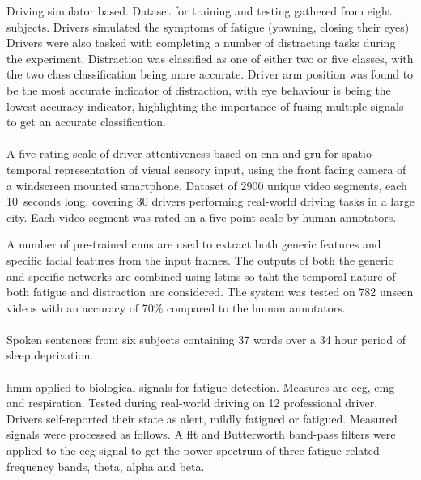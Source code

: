 \documentclass[11pt, parskip=half*,twoside=false]{scrbook}
\begin{document}
Driving simulator based. Dataset for training and testing gathered from eight subjects. Drivers simulated the symptoms of fatigue (yawning, closing their eyes) Drivers were also tasked with completing a number of distracting tasks during the experiment. Distraction was classified as one of either two or five classes, with the two class classification being more accurate. Driver arm position was found to be the most accurate indicator of distraction, with eye behaviour is being the lowest accuracy indicator, highlighting the importance of fusing multiple signals to get an accurate classification. 

\paragraph{\citet{duaAutoRateHowAttentive2019}}  A five rating scale of driver attentiveness based on \gls{cnn} and \gls{gru} for spatio-temporal representation of visual sensory input, using the front facing camera of a windscreen mounted smartphone. Dataset of 2900 unique video segments, each 10~seconds long, covering 30 drivers performing real-world driving tasks in a large city. Each video segment was rated on a five point scale by human annotators. 

A number of pre-trained \glspl{cnn} are used to extract both generic features and specific facial features from the input frames. The outputs of both the generic and specific networks are combined using \glspl{lstm} so taht the temporal nature of both fatigue and distraction are considered. The system was tested on 782 unseen videos with an accuracy of 70\% compared to the human annotators.
	
\paragraph{\citet{greeleyDetectingFatigueVoice2006}} Spoken sentences from six subjects containing 37 words over a 34 hour period of sleep deprivation. 

\paragraph{\citet{fuDynamicDriverFatigue2016}} \gls{hmm} applied to biological signals for fatigue detection. Measures are \gls{eeg}, \gls{emg} and respiration. Tested during real-world driving on 12 professional driver. Drivers self-reported their state as alert, mildly fatigued or fatigued. Measured signals were processed as follows. A \gls{fft} and Butterworth band-pass filters were applied to the \gls{eeg} signal to get the power spectrum of three fatigue related frequency bands, theta, alpha and beta. 
\end{document}
